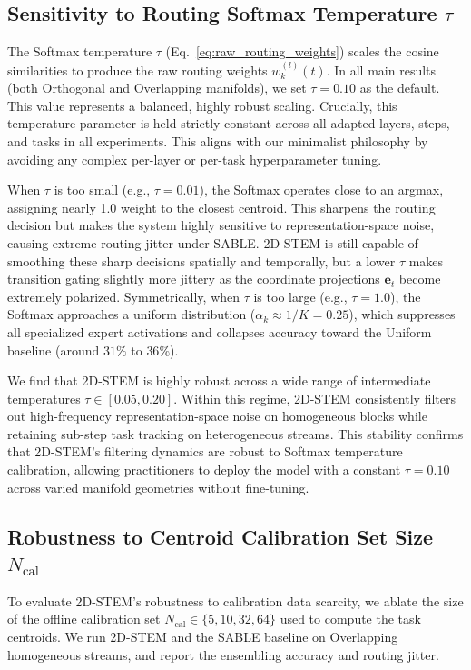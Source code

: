 \subsection{Sensitivity to Routing Softmax Temperature $\tau$}
The Softmax temperature $\tau$ (Eq.~\ref{eq:raw_routing_weights}) scales the cosine similarities to produce the raw routing weights $w_k^{(l)}(t)$. In all main results (both Orthogonal and Overlapping manifolds), we set $\tau = 0.10$ as the default. This value represents a balanced, highly robust scaling. Crucially, this temperature parameter is held strictly constant across all adapted layers, steps, and tasks in all experiments. This aligns with our minimalist philosophy by avoiding any complex per-layer or per-task hyperparameter tuning. 

When $\tau$ is too small (e.g., $\tau = 0.01$), the Softmax operates close to an argmax, assigning nearly 1.0 weight to the closest centroid. This sharpens the routing decision but makes the system highly sensitive to representation-space noise, causing extreme routing jitter under SABLE. 2D-STEM is still capable of smoothing these sharp decisions spatially and temporally, but a lower $\tau$ makes transition gating slightly more jittery as the coordinate projections $\mathbf{e}_t$ become extremely polarized. Symmetrically, when $\tau$ is too large (e.g., $\tau = 1.0$), the Softmax approaches a uniform distribution ($\alpha_k \approx 1/K = 0.25$), which suppresses all specialized expert activations and collapses accuracy toward the Uniform baseline (around $31\%$ to $36\%$).

We find that 2D-STEM is highly robust across a wide range of intermediate temperatures $\tau \in [0.05, 0.20]$. Within this regime, 2D-STEM consistently filters out high-frequency representation-space noise on homogeneous blocks while retaining sub-step task tracking on heterogeneous streams. This stability confirms that 2D-STEM's filtering dynamics are robust to Softmax temperature calibration, allowing practitioners to deploy the model with a constant $\tau = 0.10$ across varied manifold geometries without fine-tuning.

\subsection{Robustness to Centroid Calibration Set Size $N_{\text{cal}}$}
\label{sec:calibration_ablation}
To evaluate 2D-STEM's robustness to calibration data scarcity, we ablate the size of the offline calibration set $N_{\text{cal}} \in \{5, 10, 32, 64\}$ used to compute the task centroids. We run 2D-STEM and the SABLE baseline on Overlapping homogeneous streams, and report the ensembling accuracy and routing jitter.

